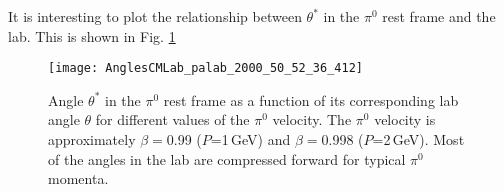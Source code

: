 \documentclass[12pt]{article}
\begin{document}
It is interesting to plot the relationship between $\theta^*$ in the $\pi^0$ rest frame and the lab. This is shown in Fig.\,\,\ref{fig:AnglesCMLab_palab_2000_50_52_36_255}
\begin{figure}[tbph]
\begin{center}
\texttt{[image: AnglesCMLab\_palab\_2000\_50\_52\_36\_412]}
\caption{Angle $\theta^*$  in the $\pi^0$ rest frame as a function of its corresponding lab angle $\theta$ for different values of the $\pi^0$ velocity. The $\pi^0$ velocity is approximately 
$\beta=$0.99 ($P$=1\,GeV) and
$\beta=$0.998 ($P$=2\,GeV). Most of the angles in the lab are compressed forward for typical $\pi^0$ momenta.
\label{fig:AnglesCMLab_palab_2000_50_52_36_255}}
\end{center}
\end{figure}


\clearpage
\newpage
\end{document}
